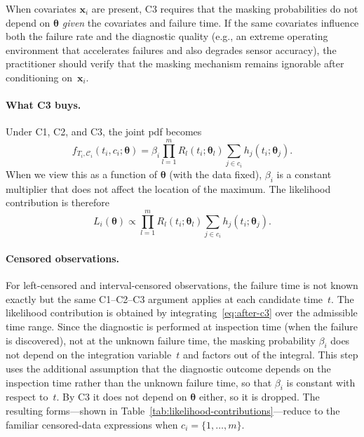 \documentclass[11pt]{article}
\theoremstyle{definition}
\theoremstyle{plain}
\renewcommand{\v}[1]{\boldsymbol{#1}}
\newcommand{\btheta}{\v{\theta}}
\begin{document}
When covariates $\v{x}_i$ are present, C3 requires that the masking
probabilities do not depend on $\btheta$ \emph{given} the covariates
and failure time.
If the same covariates influence both the failure rate and the
diagnostic quality (e.g., an extreme operating environment that
accelerates failures and also degrades sensor accuracy), the
practitioner should verify that the masking mechanism remains
ignorable after conditioning on~$\v{x}_i$.

\paragraph{What C3 buys.}
Under C1, C2, and C3, the joint pdf becomes
\begin{equation}
\label{eq:after-c3}
    f_{T_i, \mathcal{C}_i}(t_i, c_i; \btheta)
    = \beta_i \prod_{l=1}^m R_l(t_i; \v{\theta}_l)
        \sum_{j \in c_i} h_j(t_i; \v{\theta}_j).
\end{equation}
When we view this as a function of $\btheta$ (with the data fixed),
$\beta_i$ is a constant multiplier that does not affect the location of
the maximum.
The likelihood contribution is therefore
\begin{equation}
\label{eq:likelihood-exact}
    L_i(\btheta) \propto \prod_{l=1}^m R_l(t_i; \v{\theta}_l)
        \sum_{j \in c_i} h_j(t_i; \v{\theta}_j).
\end{equation}

\paragraph{Censored observations.}
For left-censored and interval-censored observations, the failure time
is not known exactly but the same C1--C2--C3 argument applies at each
candidate time~$t$.
The likelihood contribution is obtained by integrating~\eqref{eq:after-c3}
over the admissible time range.
Since the diagnostic is performed at inspection time (when the failure is
discovered), not at the unknown failure time, the masking probability
$\beta_i$ does not depend on the integration variable~$t$ and factors out
of the integral.
This step uses the additional assumption that the diagnostic outcome
depends on the inspection time rather than the unknown failure time, so
that $\beta_i$ is constant with respect to~$t$.
By C3 it does not depend on $\btheta$ either, so it is dropped.
The resulting forms---shown in
Table~\ref{tab:likelihood-contributions}---reduce to the familiar
censored-data expressions when $c_i = \{1, \ldots, m\}$.
\end{document}

